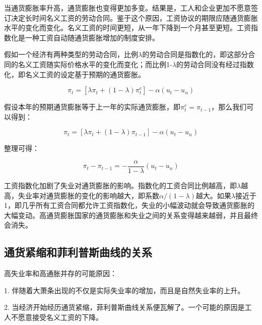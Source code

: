 \documentclass{article}
\begin{document}
当通货膨胀率升高，通货膨胀也变得更加多变。结果是，工人和企业更加不愿意签订决定长时间名义工资的劳动合同。鉴于这个原因，工资协议的期限应随通货膨胀水平的变化而变化。名义工资的时间更短，从一年下降到一个月甚至更短。工资指数化是一种工资自动随通货膨胀增加的制度安排。

假如一个经济有两种类型的劳动合同，比例$\lambda$的劳动合同是指数化的，即这部分合同的名义工资随实际价格水平的变化而变化；而比例1-$\lambda$的劳动合同没有经过指数化，即名义工资的设定基于预期的通货膨胀。

\[
\pi_t=[\lambda\pi_t+(1-\lambda)\pi_t^e]-\alpha(u_t-u_n)
\]

假设本年的预期通货膨胀等于上一年的实际通货膨胀，即$ \pi^e_t=\pi_{t-1} $，那么我们可以得到：

\[
\pi_t=[\lambda\pi_t+(1-\lambda)\pi_{t-1}]-\alpha(u_t-u_n)
\]

整理可得：

\[
\pi_t-\pi_{t-1}=-\frac{\alpha}{1-\lambda}(u_t-u_n)
\]

工资指数化加剧了失业对通货膨胀的影响。指数化的工资合同比例越高，即$\lambda$越高，失业率对通货膨胀的变化的影响越大，即系数$ \alpha/(1-\lambda) $越大。如果$\lambda$接近于1，即几乎所有工资合同都允许工资指数化，失业的小幅波动就会导致通货膨胀的大幅变动。高通货膨胀国家的通货膨胀和失业之间的关系变得越来越弱，并且最终会消失。

\subsection{通货紧缩和菲利普斯曲线的关系}

高失业率和高通胀并存的可能原因：

1. 伴随着大萧条出现的不仅是实际失业率的增加，而且是自然失业率的上升。

2. 当经济开始经历通货紧缩，菲利普斯曲线关系便瓦解了。一个可能的原因是工人不愿意接受名义工资的下降。
\end{document}
